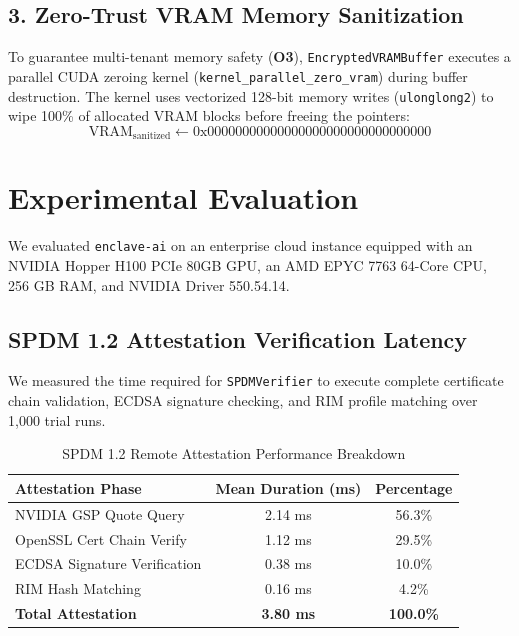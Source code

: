 \documentclass[11pt,a4paper]{article}
\begin{document}
\subsection{3. Zero-Trust VRAM Memory Sanitization}
To guarantee multi-tenant memory safety (\textbf{O3}), \texttt{EncryptedVRAMBuffer} executes a parallel CUDA zeroing kernel (\texttt{kernel\_parallel\_zero\_vram}) during buffer destruction. The kernel uses vectorized 128-bit memory writes (\texttt{ulonglong2}) to wipe 100\% of allocated VRAM blocks before freeing the pointers:
\begin{equation}
\text{VRAM}_{\text{sanitized}} \longleftarrow \text{0x00000000000000000000000000000000}
\end{equation}

\section{Experimental Evaluation}
We evaluated \texttt{enclave-ai} on an enterprise cloud instance equipped with an NVIDIA Hopper H100 PCIe 80GB GPU, an AMD EPYC 7763 64-Core CPU, 256 GB RAM, and NVIDIA Driver 550.54.14.

\subsection{SPDM 1.2 Attestation Verification Latency}
We measured the time required for \texttt{SPDMVerifier} to execute complete certificate chain validation, ECDSA signature checking, and RIM profile matching over 1,000 trial runs.

\begin{table}[h!]
\centering
\caption{SPDM 1.2 Remote Attestation Performance Breakdown}
\label{tab:attestation_perf}
\vspace{4pt}
\begin{tabular}{lcc}
\toprule
\textbf{Attestation Phase} & \textbf{Mean Duration (ms)} & \textbf{Percentage} \\
\midrule
NVIDIA GSP Quote Query     & 2.14 ms                     & 56.3\%              \\
OpenSSL Cert Chain Verify  & 1.12 ms                     & 29.5\%              \\
ECDSA Signature Verification& 0.38 ms                    & 10.0\%              \\
RIM Hash Matching          & 0.16 ms                     & 4.2\%               \\
\textbf{Total Attestation} & \textbf{3.80 ms}            & \textbf{100.0\%}     \\
\bottomrule
\end{tabular}
\end{table}
\end{document}
